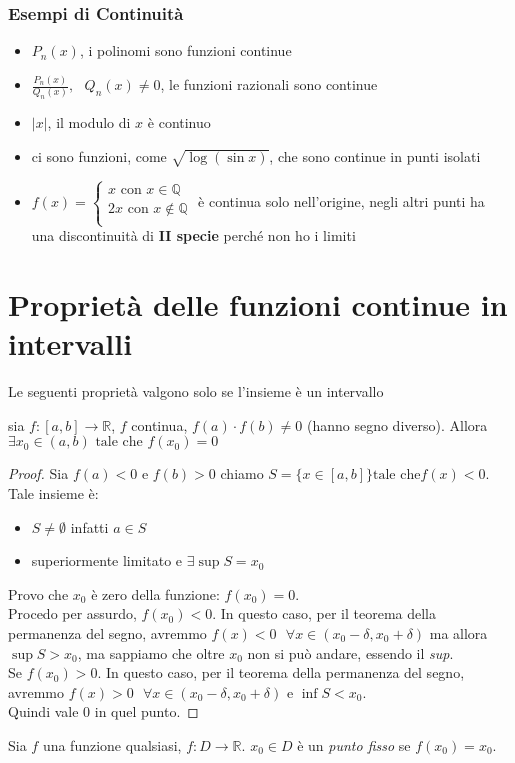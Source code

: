 \documentclass[a4paper,12pt, oneside]{book}
\begin{document}
\subsubsection{Esempi di Continuità}
\begin{itemize}
\item $P_n(x)$, i polinomi sono funzioni continue
\item $\frac{P_n(x)}{Q_n(x)}, \mbox{ } Q_n(x)\neq 0$, le funzioni razionali sono continue
\item $|x|$, il modulo di $x$ è continuo
\item ci sono funzioni, come $\sqrt{\log(\sin x)}$, che sono continue in punti isolati
\item $f(x)=\left\{
                \begin{array}{ll}
                x \mbox{ con } x\in\mathbb{Q} \\
                2x \mbox{ con } x\not\in\mathbb{Q} \\
				\end{array}
				\right.$ è continua solo nell'origine, negli altri punti ha una discontinuità di \textbf{II specie} perché non ho i limiti
\end{itemize}
\newpage
\section{Proprietà delle funzioni continue in intervalli}
Le seguenti proprietà valgono solo se l'insieme è un intervallo
\begin{teorema}
sia $f:[a,b]\rightarrow \mathbb{R}$, $f$ continua, $f(a)\cdot f(b)\neq 0$ (hanno segno diverso). Allora $\exists x_0\in (a,b) \mbox{ tale che } f(x_0)=0$
\end{teorema}
\begin{proof}
Sia $f(a)<0$ e $f(b)>0$ chiamo $S=\{x\in [a,b]\} \mbox{tale che} f(x)<0$. Tale insieme è:
\begin{itemize}
\item $S \neq \emptyset$ infatti $a\in S$
\item superiormente limitato e $\exists \sup S= x_0$
\end{itemize}
Provo che $x_0$ è zero della funzione: $f(x_0)=0$.\\ Procedo per assurdo, $f(x_0)<0$. In questo caso, per il teorema della permanenza del segno, avremmo  $f(x)<0 \mbox{ } \forall x \in (x_0-\delta, x_0+\delta)$ ma allora $\sup S>x_0$, ma sappiamo che oltre $x_0$ non si può andare, essendo il \textit{sup}.\\
Se $f(x_0)>0$. In questo caso, per il teorema della permanenza del segno, avremmo $f(x)>0 \mbox{ } \forall x \in (x_0-\delta, x_0+\delta)$ e $\inf S<x_0$.\\
Quindi vale $0$ in quel punto. 
\end{proof}
\begin{shaded}
Sia $f$ una funzione qualsiasi, $f:D\rightarrow \mathbb{R}$. $x_0\in D$ è un \textit{punto fisso} se $f(x_0)=x_0$.
\end{shaded}
\end{document}
